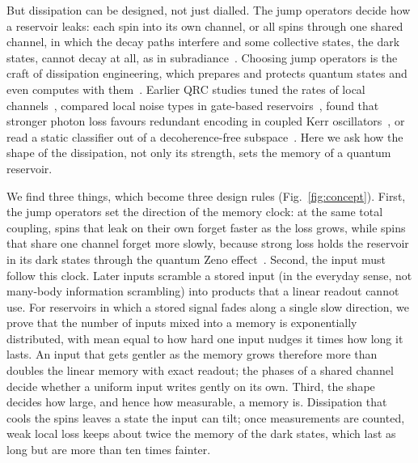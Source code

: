But dissipation can be designed, not just dialled. The jump operators decide how a reservoir leaks: each spin into
its own channel, or all spins through one shared channel, in which the decay paths interfere and some collective
states, the dark states, cannot decay at all, as in subradiance~\cite{Dicke1954,AsenjoGarcia2017,Facchinetti2016}.
Choosing jump operators is the craft of dissipation engineering, which prepares and protects quantum states and even
computes with them~\cite{Poyatos1996,Verstraete2009,Pastawski2011,Harrington2022}. Earlier QRC studies tuned the
rates of local channels~\cite{Sannia2024}, compared local noise types in gate-based reservoirs~\cite{Kubota2023,Fry2023},
found that stronger photon loss favours redundant encoding in coupled Kerr oscillators~\cite{Cheamsawat2025}, or read
a static classifier out of a decoherence-free subspace~\cite{Akshay2026}. Here we ask how the shape of the
dissipation, not only its strength, sets the memory of a quantum reservoir.

We find three things, which become three design rules (Fig.~\ref{fig:concept}). First, the jump operators set the
direction of the memory clock: at the same total coupling, spins that leak on their own forget faster as the loss
grows, while spins that share one channel forget more slowly, because strong loss holds the reservoir in its dark
states through the quantum Zeno effect~\cite{FacchiPascazio2002,Zanardi2014,Burgarth2019}. Second, the input must
follow this clock. Later inputs scramble a stored input (in the everyday sense, not many-body information scrambling)
into products that a linear readout cannot use. For reservoirs in which a stored signal fades along a single slow
direction, we prove that the number of inputs mixed into a memory is exponentially distributed, with mean equal to
how hard one input nudges it times how long it lasts. An input that gets gentler as the memory grows therefore more
than doubles the linear memory with exact readout; the phases of a shared channel decide whether a uniform input
writes gently on its own. Third, the shape decides how large, and hence how measurable, a memory is. Dissipation that
cools the spins leaves a state the input can tilt; once measurements are counted, weak local loss keeps about twice
the memory of the dark states, which last as long but are more than ten times fainter.

